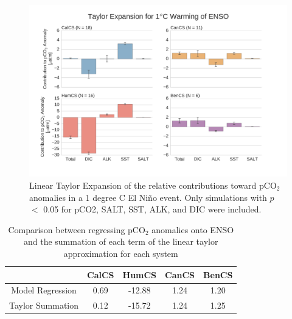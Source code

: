 \documentclass[12pt]{article}
\begin{document}
\clearpage
\begin{figure}[!h]
	\centering
	\includegraphics[width=\linewidth]{../../figs/all-systems/taylor_expansions/taylor-expansion-ENSO-pCO2-PVALUEREMOVED-smoothedClimate.png}
	\caption{Linear Taylor Expansion of the relative contributions toward pCO$_{2}$ anomalies in a 1 degree C El Ni\~no event. Only simulations with $p$ $<$ 0.05 for pCO2, SALT, SST, ALK, and DIC were included.}
	\label{fig:taylor-enso}
\end{figure}
\begin{table}[!h]
	\centering
\begin{tabular}{c | c c c c }
	& CalCS & HumCS & CanCS & BenCS \\
	\midrule
	Model Regression & 0.69 & -12.88 & 1.24 & 1.20 \\
	Taylor Summation & 0.12 & -15.72 & 1.24 & 1.25 \\
\end{tabular}
	\caption{Comparison between regressing pCO$_{2}$ anomalies onto ENSO and the summation of each term of the linear taylor approximation for each system}
	\label{tab:taylor-enso}
\end{table}
\end{document}
